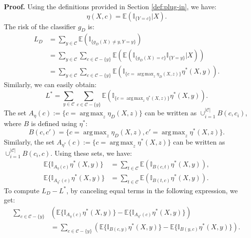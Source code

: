 \documentclass[12pt]{article}
\DeclareMathOperator*{\argmax}{arg\,max}
\begin{document}
	\textbf{Proof.} Using the definitions provided in Section \ref{def:plug-in}, we have:
	\begin{equation}
		\eta(X, c) = \mathbb{E}(\mathbb{I}_{\{Y=c\}} | X).
	\end{equation}
	The risk of the classifier $g_D$ is:
	\begin{align}
		L_D &= \sum_{y \in \mathcal{C}} \mathbb{E}(\mathbb{I}_{\{g_D(X) \neq y, Y = y\}}) \\
		&= \sum_{y \in \mathcal{C}} \sum_{c \in \mathcal{C} - \{y\}} \mathbb{E}(\mathbb{E}(\mathbb{I}_{\{g_D(X)=c\}} \mathbb{I}_{\{Y=y\}} | X)) \\
		&= \sum_{y \in \mathcal{C}} \sum_{c \in \mathcal{C} - \{y\}} \mathbb{E}\left( \mathbb{I}_{\{c = \argmax_z \eta_D(X, z)\}} \eta^*(X, y) \right).
	\end{align}
	Similarly, we can easily obtain:
	\begin{equation}
		L^* = \sum_{y \in \mathcal{C}} \sum_{c \in \mathcal{C} - \{y\}} \mathbb{E}\left( \mathbb{I}_{\{c = \argmax_z \eta^*(X, z)\}} \eta^*(X, y) \right).
	\end{equation}
	The set $A_{\eta}(c) := \{c = \argmax_z \eta_D(X, z)\}$ can be written as $\cup_{i=1}^{|\mathcal{C}|} B(c, c_i)$, where $B$ is defined using $\eta^*$:
	\begin{equation}
		B(c, c') = \{c = \argmax_z \eta_D(X, z), c' = \argmax_z \eta^*(X, z)\}.
	\end{equation}
	Similarly, the set $A_{\eta^*}(c) := \{c = \argmax_z \eta^*(X, z)\}$ can be written as $\cup_{i=1}^{|\mathcal{C}|} B(c_i, c)$. Using these sets, we have:
	\begin{align}
		\mathbb{E}\{ \mathbb{I}_{A_{\eta}(c)} \eta^*(X, y) \} &= \sum_{t \in \mathcal{C}} \mathbb{E}( \mathbb{I}_{B(c, t)} \eta^*(X, y) ), \\
		\mathbb{E}\{ \mathbb{I}_{A_{\eta^*}(c)} \eta^*(X, y) \} &= \sum_{t \in \mathcal{C}} \mathbb{E}( \mathbb{I}_{B(t, c)} \eta^*(X, y) ).
	\end{align}
	To compute $L_D - L^*$, by canceling equal terms in the following expression, we get:
	\begin{align}
		\sum_{c \in \mathcal{C} - \{y\}} &\left( \mathbb{E}\{ \mathbb{I}_{A_{\eta}(c)} \eta^*(X, y) \} - \mathbb{E}\{ \mathbb{I}_{A_{\eta^*}(c)} \eta^*(X, y) \} \right) \\
		&= \sum_{c \in \mathcal{C} - \{y\}} \left( \mathbb{E}\{ \mathbb{I}_{B(c, y)} \eta^*(X, y) \} - \mathbb{E}\{ \mathbb{I}_{B(y, c)} \eta^*(X, y) \} \right).
	\end{align}
\end{document}

